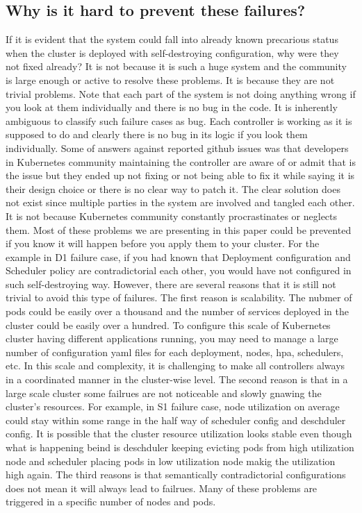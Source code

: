 \subsection*{Why is it hard to prevent these failures?}
If it is evident that the system could fall into already known precarious status when the cluster is deployed with self-destroying configuration, why were they not fixed already? It is not because it is such a huge system and the community is large enough or active to resolve these problems. It is because they are not trivial problems. Note that each part of the system is not doing anything wrong if you look at them individually and there is no bug in the code.
It is inherently ambiguous to classify such failure cases as bug. Each controller is working as it is supposed to do and clearly there is no bug in its logic if you look them individually. Some of answers against reported github issues was that developers in Kubernetes community maintaining the controller are aware of or admit that is the issue but they ended up not fixing or not being able to fix it while saying it is their design choice or there is no clear way to patch it. The clear solution does not exist since multiple parties in the system are involved and tangled each other. It is not because Kubernetes community constantly procrastinates or neglects them. 
Most of these problems we are presenting in this paper could be prevented if you know it will happen before you apply them to your cluster. For the example in D1 failure case, if you had known that Deployment configuration and Scheduler policy are contradictorial each other, you would have not configured in such self-destroying way. However, there are several reasons that it is still not trivial to avoid this type of failures. The first reason is scalability. The nubmer of pods could be easily over a thousand and the number of services deployed in the cluster could be easily over a hundred. To configure this scale of Kubernetes cluster having different applications running, you may need to manage a large number of configuration yaml files for each deployment, nodes, hpa, schedulers, etc. In this scale and complexity, it is challenging to make all controllers always in a coordinated manner in the cluster-wise level. The second reason is that in a large scale cluster some failrues are not noticeable and slowly gnawing the cluster's resources. For example, in S1 failure case, node utilization on average could stay within some range in the half way of scheduler config and deschduler config. It is possible that the cluster resource utilization looks stable even though what is happening beind is deschduler keeping evicting pods from high utilization node and scheduler placing pods in low utilization node makig the utilization high again. The third reasons is that semantically contradictorial configurations does not mean it will always lead to failrues. Many of these problems are triggered in a specific number of nodes and pods. 

